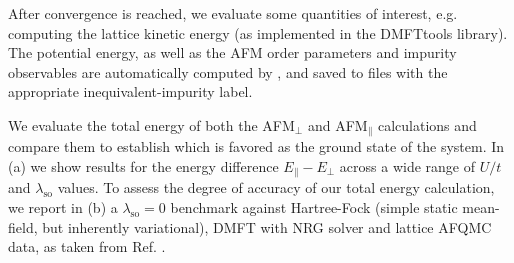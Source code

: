 \documentclass[edipack_sp.tex]{subfiles}
\begin{document}
After convergence is reached, we evaluate some quantities of interest, e.g. computing the 
lattice kinetic energy (as implemented in the {DMFTtools} 
library). The potential energy, as well as the AFM order parameters
and impurity observables are automatically computed by \NAME, 
and saved to files with the appropriate inequivalent-impurity label.

We evaluate the total energy of both the AFM$_\perp$
and AFM$_\parallel$ calculations and compare them to establish which  is favored as the ground state of the system. In (a)
we show results for the energy difference $E_\parallel-E_\perp$ across a wide range of $U/t$ and $\lambda_\mathrm{so}$ values. To assess the
degree of accuracy of our total energy calculation, we report in
(b) a $\lambda_\mathrm{so}=0$ benchmark against
Hartree-Fock (simple static mean-field, but inherently variational), 
DMFT with NRG solver and lattice AFQMC data, as taken from 
Ref. \cite{Raczkowski2020PRB}. 
\end{document}
